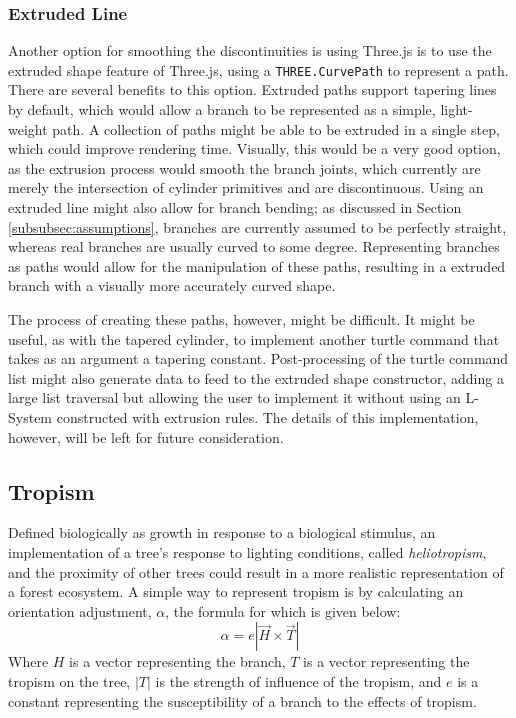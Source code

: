 \documentclass{article}
\newcommand{\tab}{\hspace*{2em}}
\begin{document}
            \subsubsection{Extruded Line}
    \tab Another option for smoothing the discontinuities is using Three.js is to use the extruded
shape feature of Three.js, using a \verb|THREE.CurvePath| to represent a path. There are several
benefits to this option. Extruded paths support tapering lines by default, which would allow a
branch to be represented as a simple, light-weight path. A collection of paths might be able to be
extruded in a single step, which could improve rendering time. Visually, this would be a very good
option, as the extrusion process would smooth the branch joints, which currently are merely the
intersection of cylinder primitives and are discontinuous. Using an extruded line might also allow
for branch bending; as discussed in Section \ref{subsubsec:assumptions}, branches are currently
assumed to be perfectly straight, whereas real branches are usually curved to some degree.
Representing branches as paths would allow for the manipulation of these paths, resulting in a
extruded branch with a visually more accurately curved shape.

    \tab The process of creating these paths, however, might be difficult. It might be
useful, as with the tapered cylinder, to implement another turtle command that takes as an argument
a tapering constant. Post-processing of the turtle command list might also generate data to feed to
the extruded shape constructor, adding a large list traversal but allowing the user to implement it
without using an L-System constructed with extrusion rules. The details of this implementation,
however, will be left for future consideration.

        \subsection{Tropism}
    \tab Defined biologically as growth in response to a biological stimulus, an implementation of
a tree's response to lighting conditions, called \emph{heliotropism}, and the proximity of other
trees could result in a more realistic representation of a forest ecosystem. A simple way to
represent tropism is by calculating an orientation adjustment, $\alpha$, the formula for which is
given below:\cite{abp96}
    \begin{displaymath}
        \alpha = e | \overrightarrow{H} \times \overrightarrow{T} |
    \end{displaymath}
Where $H$ is a vector representing the branch, $T$ is a vector representing the tropism on the
tree, $|T|$ is the strength of influence of the tropism, and $e$ is a constant representing the
susceptibility of a branch to the effects of tropism.
\end{document}
